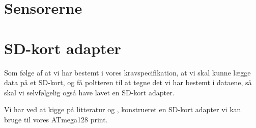 \section{Sensorerne}



\section{SD-kort adapter}
Som følge af at vi har bestemt i vores kravspecifikation, at vi skal kunne lægge data på et
SD-kort, og få poltteren til at tegne det vi har bestemt i dataene, så
skal vi selvfølgelig også have lavet en SD-kort adapter.

Vi har ved at kigge på litteratur \cite{web:captain-mmc} og
\cite{web:sd-pinout}, konstrueret en SD-kort adapter vi kan bruge til
vores ATmega128 print.



